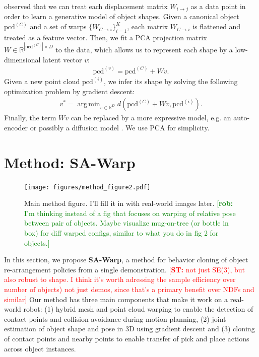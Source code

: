 \documentclass{article}
\DeclareMathOperator*{\argmin}{arg\,min}
\newcommand{\rob}[1]{\textcolor{green}{[\textbf{rob:} #1]}}
\newcommand{\rst}
[1]{\textcolor{red}
{[\textbf{ST:} #1]}}
\newcommand{\pcx}[1]{\mathrm{pcd}^{(#1)}}
\newcommand{\wxy}[2]{W_{#1 \rightarrow #2}}
\newcommand{\pci}{\pcx{i}}
\newcommand{\pcc}{\pcx{C}}
\newcommand{\wij}{\wxy{i}{j}}
\newcommand{\wci}{\wxy{C}{i}}
\begin{document}
\citet{rodriguez18transferring} observed that we can treat each displacement matrix $\wij$ as a data point in order to learn a generative model of object shapes. Given a canonical object $\pcc$ and a set of warps $\{ \wci \}_{i=1}^K$, each matrix $\wci$ is flattened and treated as a feature vector. Then, we fit a PCA projection matrix $W \in \mathbb{R}^{|\pcc|{\times}D}$ to the data, which allows us to represent each shape by a low-dimensional latent vector $v$:
\begin{align}
    \pcx{v} = \pcc + W v.
\end{align}
Given a new point cloud $\pci$, we infer its shape by solving the following optimization problem by gradient descent:
\begin{align}
    v^* = \argmin_{v \in \mathbb{R}^D} d(\pcc + W v, \pci).
\end{align}
Finally, the term $Wv$ can be replaced by a more expressive model, e.g. an auto-encoder \cite{thompson21shapebased} or possibly a diffusion model \cite{nichol22pointe}. We use PCA for simplicity.

\section{Method: SA-Warp}

\begin{figure}
    \centering
    \texttt{[image: figures/method\_figure2.pdf]}
    \caption{Main method figure. I'll fill it in with real-world images later. \rob{I'm thinking instead of a fig that focuses on warping of relative pose between pair of objects. Maybe visualize mug-on-tree (or bottle in box) for diff warped configs, similar to what you do in fig 2 for objects.}}
    \label{fig:method}
\end{figure}

In this section, we propose \textbf{SA-Warp}, a method for behavior cloning of object re-arrangement policies from a single demonstration. \rst{not just SE(3), but also robust to shape. I think it's worth adressing the sample efficiency over number of objects) not just demos, since that's a primary benefit over NDFs and similar} Our method has three main components that make it work on a real-world robot: (1) hybrid mesh and point cloud warping to enable the detection of contact points and collision avoidance during motion planning, (2) joint estimation of object shape and pose in 3D using gradient descent and (3) cloning of contact points and nearby points to enable transfer of pick and place actions across object instances.
\end{document}
